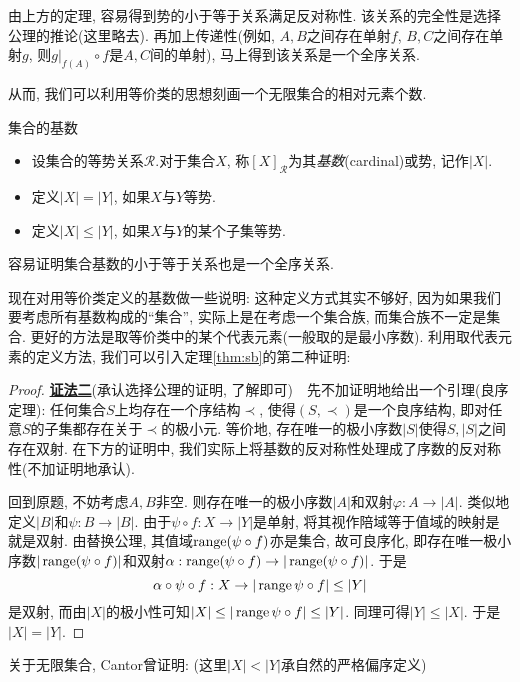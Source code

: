 由上方的定理, 容易得到势的小于等于关系满足反对称性. 该关系的完全性是选择公理的推论(这里略去). 再加上传递性(例如, $A, B$之间存在单射$f$, $B, C$之间存在单射$g$, 则$g|_{f(A)} \circ f$是$A, C$间的单射), 马上得到该关系是一个全序关系. 

从而, 我们可以利用等价类的思想刻画一个无限集合的相对元素个数.

\begin{definition}{集合的基数}
	\vspace{-2em}
	\begin{itemize}
		\item 设集合的等势关系$\mathcal{R}$.对于集合$X$, 称$[X]_{\mathcal{R}}$为其\textit{基数}(cardinal)或势, 记作$|X|$.
		\item 定义$|X| = |Y|$, 如果$X$与$Y$等势.
		\item 定义$|X| \leq |Y|$, 如果$X$与$Y$的某个子集等势.
	\end{itemize}
\end{definition}

容易证明集合基数的小于等于关系也是一个全序关系. 

现在对用等价类定义的基数做一些说明: 这种定义方式其实不够好, 因为如果我们要考虑所有基数构成的“集合”, 实际上是在考虑一个集合族, 而集合族不一定是集合. 更好的方法是取等价类中的某个代表元素(一般取的是最小序数). 利用取代表元素的定义方法, 我们可以引入定理\ref{thm:sb}的第二种证明: 

\begin{proof}
	\underline{\textbf{证法二}}(承认选择公理的证明, 了解即可)~~先不加证明地给出一个引理(良序定理): 任何集合$S$上均存在一个序结构$\prec$, 使得$(S,\prec)$是一个良序结构, 即对任意$S$的子集都存在关于$\prec$的极小元. 等价地, 存在唯一的极小序数$|S|$使得$S,|S|$之间存在双射. 在下方的证明中, 我们实际上将基数的反对称性处理成了序数的反对称性(不加证明地承认). 
	
	回到原题, 不妨考虑$A,B$非空. 则存在唯一的极小序数$|A|$和双射$\varphi :A \to |A|$. 类似地定义$|B|$和$\psi :B \to |B|$. 由于$\psi \circ f:X \to |Y|$是单射, 将其视作陪域等于值域的映射是就是双射. 由替换公理, 其值域$\operatorname{range} (\psi \circ f)$亦是集合, 故可良序化, 即存在唯一极小序数$|\operatorname{range} (\psi \circ f)|$和双射$\alpha :\operatorname{range} (\psi \circ f) \to |\operatorname{range} (\psi \circ f)|$. 于是$$\alpha \circ \psi \circ f:X \to |\operatorname{range} \psi \circ f| \leq |Y|$$
	是双射, 而由$|X|$的极小性可知$|X| \leq |\operatorname{range} \psi \circ f| \leq |Y|$. 同理可得$|Y| \leq |X|$. 于是$|X|=|Y|$. 
\end{proof}



关于无限集合, Cantor曾证明: (这里$|X|<|Y|$承自然的严格偏序定义)

